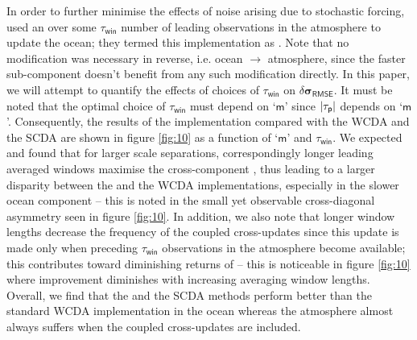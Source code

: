 \documentclass[a4paper,10pt]{article}
\begin{document}
\begin{multicols}{2}
In order to further minimise the effects of noise arising due to stochastic forcing, \citet{lu2015a} used an  over some $\tau_\mathsf{win}$ number of leading observations in the atmosphere to update the ocean; they termed this implementation as {\lacc} \citep{lu2015a, lu2015b}. Note that no modification was necessary in reverse, i.e. ocean $\rightarrow$ atmosphere, since the faster sub-component doesn't benefit from any such modification directly. In this paper, we will attempt to quantify the effects of choices of $\tau_\mathsf{win}$ on $\delta\boldsymbol{\sigma}_\mathsf{RMSE}$. It must be noted that the optimal choice of $\tau_\mathsf{win}$ must depend on `$\mathsf{m}$' since $|\tau_\mathsf{p}|$ depends on `$\mathsf{m}$'. Consequently, the results of the {\lacc} implementation compared with the \textsf{WCDA} and the \textsf{SCDA} are shown in figure \ref{fig:10} as a function of `$\mathsf{m}$' and $\tau_\mathsf{win}$. We expected and found that for larger scale separations, correspondingly longer leading averaged windows maximise the cross-component {\snr}, thus leading to a larger disparity between the {\lacc} and the \textsf{WCDA} implementations, especially in the slower ocean component -- this is noted in the small yet observable cross-diagonal asymmetry seen in figure \ref{fig:10}. In addition, we also note that longer window lengths decrease the frequency of the coupled cross-updates since this update is made only when preceding $\tau_\mathsf{win}$ observations in the atmosphere become available; this contributes toward diminishing returns of {\lacc} -- this is noticeable in figure \ref{fig:10} where improvement diminishes with increasing averaging window lengths. Overall, we find that the {\lacc} and the \textsf{SCDA} methods perform better than the standard \textsf{WCDA} implementation in the ocean whereas the atmosphere almost always suffers when the coupled cross-updates are included. 

\end{multicols}
\end{document}
